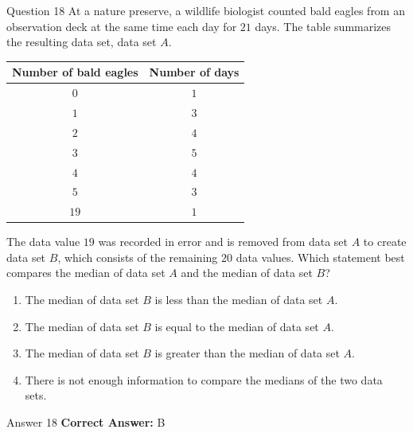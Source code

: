\documentclass{beamer}
\begin{document}
\begin{frame}{Question 18}
\small
At a nature preserve, a wildlife biologist counted bald eagles from an observation deck at the same time each day for \(21\) days.
The table summarizes the resulting data set, data set \(A\).

\begin{center}
\begin{tabular}{|c|c|}
\hline
Number of bald eagles & Number of days \\
\hline
\(0\) & \(1\) \\
\(1\) & \(3\) \\
\(2\) & \(4\) \\
\(3\) & \(5\) \\
\(4\) & \(4\) \\
\(5\) & \(3\) \\
\(19\) & \(1\) \\
\hline
\end{tabular}
\end{center}

The data value \(19\) was recorded in error and is removed from data set \(A\) to create data set \(B\), which consists of the remaining \(20\) data values.
Which statement best compares the median of data set \(A\) and the median of data set \(B\)?
\vspace{0.35cm}
\begin{enumerate}
    \item[A.] The median of data set \(B\) is less than the median of data set \(A\).
    \item[B.] The median of data set \(B\) is equal to the median of data set \(A\).
    \item[C.] The median of data set \(B\) is greater than the median of data set \(A\).
    \item[D.] There is not enough information to compare the medians of the two data sets.
\end{enumerate}
\end{frame}
\begin{frame}{Answer 18}
\small
\textbf{Correct Answer:} B
\end{frame}
\end{document}
